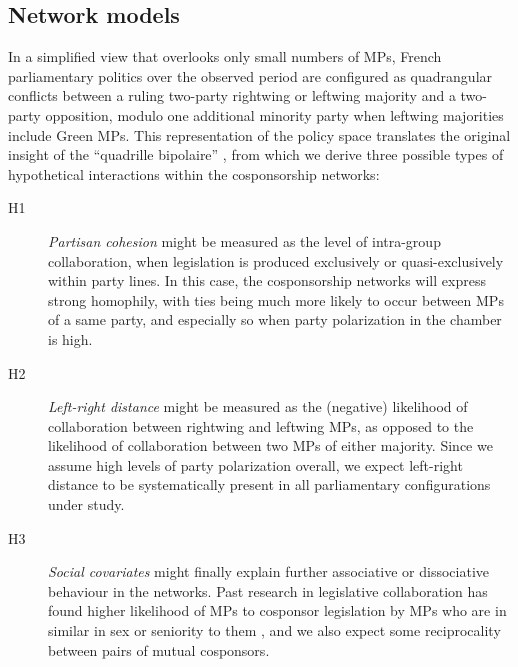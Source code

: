 \subsection{Network models}

In a simplified view that overlooks only small numbers of MPs, French parliamentary politics over the observed period are configured as quadrangular conflicts between a ruling two-party rightwing or leftwing majority and a two-party opposition, modulo one additional minority party when leftwing majorities include Green MPs. This representation of the policy space translates the original insight of the ``quadrille bipolaire'' \citep{Duverger1968-PUF}, from which we derive three possible types of hypothetical interactions within the cosponsorship networks:%

\begin{description}

  \item[H1] \emph{Partisan cohesion} might be measured as the level of intra-group collaboration, when legislation is produced exclusively or quasi-exclusively within party lines. In this case, the cosponsorship networks will express strong homophily, with ties being much more likely to occur between MPs of a same party, and especially so when party polarization in the chamber is high.%

  \item[H2] \emph{Left-right distance} might be measured as the (negative) likelihood of collaboration between rightwing and leftwing MPs, as opposed to the likelihood of collaboration between two MPs of either majority. Since we assume high levels of party polarization overall, we expect left-right distance to be systematically present in all parliamentary configurations under study.%

  \item[H3] \emph{Social covariates} might finally explain further associative or dissociative behaviour in the networks. Past research in legislative collaboration has found higher likelihood of MPs to cosponsor legislation by MPs who are in similar in sex or seniority to them \citep{BrattonRouse2011-LSQ,ClarkCaro2013-PG}, and we also expect some reciprocality between pairs of mutual cosponsors.%

\end{description}


